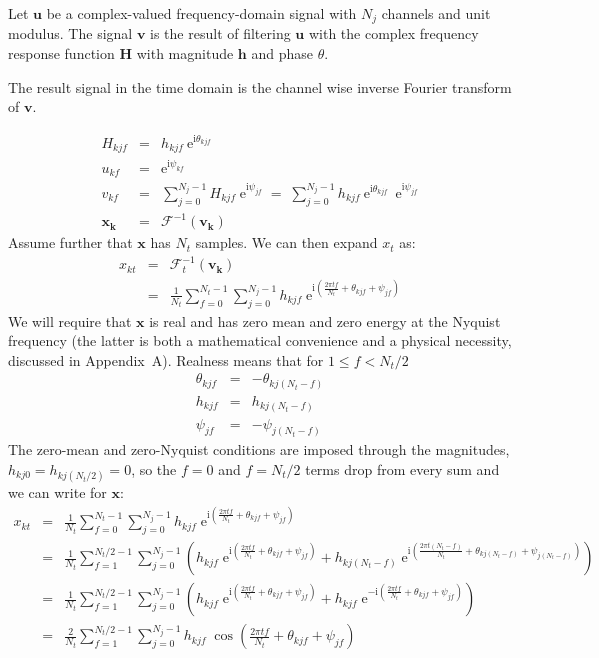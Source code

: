 \documentclass[10pt,a4paper]{article}
\numberwithin{equation}{section}
\newcommand{\mat}[1]{\left(#1\right)}
\newcommand{\m}[1]{\mathrm{#1}}
\begin{document}
Let $\mathbf{u}$ be a complex-valued frequency-domain signal with $N_j$ channels and unit modulus. The signal $\mathbf{v}$ is the result of filtering $\mathbf{u}$ with the complex frequency response function $\mathbf{H}$ with magnitude $\mathbf{h}$ and phase $\theta$.

The result signal in the time domain is the channel wise inverse Fourier transform of $\mathbf{v}$.

\begin{eqnarray}
	H_{k j f} &=& h_{k j f} \: \m{e}^{\m{i} \theta_{k j f}} \\
	u_{k f} &=& \m{e}^{\m{i} \psi_{k f}} \\
	v_{k f} &=& \sum_{j=0}^{N_j-1} H_{k j f} \; \m{e}^{\m{i} \psi_{j f}} 
			\;=\; \sum_{j=0}^{N_j-1} h_{k j f} \: \m{e}^{\m{i} \theta_{k j f}} \:\; \m{e}^{\m{i} \psi_{j f}} \\
	\mathbf{x_k} &=& \mathcal{F}^{\m{-1}} \mat{\mathbf{v_k}}
\end{eqnarray}
Assume further that $\mathbf{x}$ has $N_t$ samples. We can then expand $x_t$ as:
\begin{eqnarray}
	x_{k t}
	&=& \mathcal{F}^{\m{-1}}_t \mat{\mathbf{v_k}} \\
	&=&  \frac{1}{N_t} \sum_{f=0}^{N_t-1}
\sum_{j=0}^{N_j-1} h_{k j f} \; \m{e}^{\m{i}\mat{\frac{2 \pi t f}{N_t} + \theta_{k j f} + \psi_{j f}}} 
\end{eqnarray}
We will require that $\mathbf{x}$ is real and has zero mean and zero energy at the Nyquist frequency (the latter is both a mathematical convenience and a physical necessity, discussed in Appendix~A). Realness means that for $1 \leq f < N_t/2$
\begin{eqnarray}
	\theta_{k j f} &=& - \theta_{k j \mat{N_t  - f}} \\
	h_{k j f} &=& h_{k j \mat{N_t  - f}} \\
	\psi_{j f} &=& - \psi_{j \mat{N_t  - f}}
\end{eqnarray}
The zero-mean and zero-Nyquist conditions are imposed through the magnitudes, $h_{k j 0} = h_{k j \mat{N_t/2}} = 0$, so the $f = 0$ and $f = N_t/2$ terms drop from every sum and we can write for $\mathbf{x}$:
\begin{eqnarray}
	x_{k t}
	&=&  \frac{1}{N_t} \sum_{f=0}^{N_t-1}
		\sum_{j=0}^{N_j-1} h_{k j f} \; \m{e}^{\m{i}\mat{\frac{2 \pi t f}{N_t} + \theta_{k j f} + \psi_{j f}}} \\
	&=&  \frac{1}{N_t} \sum_{f=1}^{N_t/2-1}
		\sum_{j=0}^{N_j-1} 
		\mat{h_{k j f} \; \m{e}^{\m{i}\mat{\frac{2 \pi t f}{N_t} + \theta_{k j f} + \psi_{j f}}}			
		+ h_{k j \mat{N_t - f}} \; \m{e}^{\m{i}\mat{\frac{2 \pi t \mat{N_t - f}}{N_t} + \theta_{k j \mat{N_t - f}} + \psi_{j \mat{N_t - f}}}}} \\
	&=&  \frac{1}{N_t} \sum_{f=1}^{N_t/2 - 1}
		\sum_{j=0}^{N_j-1} 
		\mat{h_{k j f} \; \m{e}^{\m{i}\mat{\frac{2 \pi t f}{N_t} + \theta_{k j f} + \psi_{j f}}}
	    + h_{k j f} \; \m{e}^{-\m{i}\mat{\frac{2 \pi t f}{N_t} + \theta_{k j f} + \psi_{j f}}}} \\	
	&=&	\frac{2}{N_t} \sum_{f=1}^{N_t/2 - 1}
		\sum_{j=0}^{N_j-1} h_{k j f} \; \cos\mat{\frac{2 \pi t f}{N_t} + \theta_{k j f} + \psi_{j f}} \\
\end{eqnarray}
\end{document}

